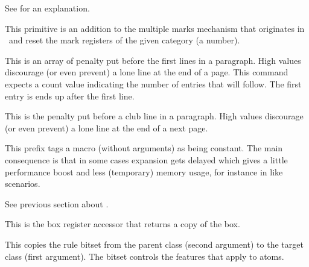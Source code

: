 \stopoldprimitive

\startoldprimitive[title={\prm {cleaders}}]

See  for an explanation.

\stopoldprimitive

\startnewprimitive[title={\prm {clearmarks}}]

This primitive is an addition to the multiple marks mechanism that originates in
\ETEX\ and reset the mark registers of the given category (a number).

\stopnewprimitive

\startoldprimitive[title={\prm {clubpenalties}}]

This is an array of penalty put before the first lines in a paragraph. High values
discourage (or even prevent) a lone line at the end of a page. This
command expects a count value indicating the number of entries that will follow.
The first entry is ends up after the first line.

\stopoldprimitive

\startoldprimitive[title={\prm {clubpenalty}}]

This is the penalty put before a club line in a paragraph. High values discourage
(or even prevent) a lone line at the end of a next page.

\stopoldprimitive

\startnewprimitive[title={\prm {constant}}]

This prefix tags a macro (without arguments) as being constant. The main
consequence is that in some cases expansion gets delayed which gives a little
performance boost and less (temporary) memory usage, for instance in \type
{\csname} like scenarios.

\stopnewprimitive

\startnewprimitive[title={\prm {constrained}}]

See previous section about .

\stopnewprimitive

\startoldprimitive[title={\prm {copy}}]

This is the box register accessor that returns a copy of the box.

\stopoldprimitive

\startnewprimitive[title={\prm {copymathatomrule}}]

This copies the rule bitset from the parent class (second argument) to the target
class (first argument). The bitset controls the features that apply to atoms.

